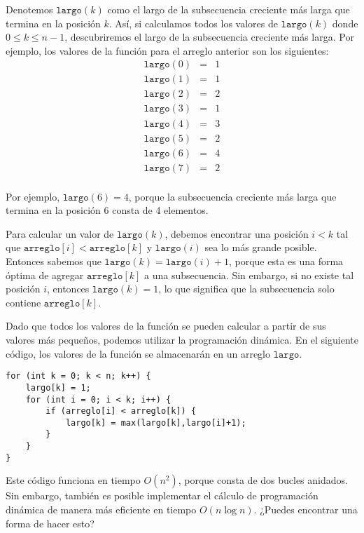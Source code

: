 Denotemos $\texttt{largo}(k)$ como
el largo de la
subsecuencia creciente más larga
que termina en la posición $k$.
Así, si calculamos todos los valores de
$\texttt{largo}(k)$ donde $0 \le k \le n-1$,
descubriremos el largo de la
subsecuencia creciente más larga.
Por ejemplo, los valores de la función
para el arreglo anterior son los siguientes:
\[
\begin{array}{lcl}
\texttt{largo}(0) & = & 1 \\
\texttt{largo}(1) & = & 1 \\
\texttt{largo}(2) & = & 2 \\
\texttt{largo}(3) & = & 1 \\
\texttt{largo}(4) & = & 3 \\
\texttt{largo}(5) & = & 2 \\
\texttt{largo}(6) & = & 4 \\
\texttt{largo}(7) & = & 2 \\
\end{array}
\]

Por ejemplo, $\texttt{largo}(6)=4$,
porque la subsecuencia creciente más larga
que termina en la posición 6 consta de 4 elementos.

Para calcular un valor de $\texttt{largo}(k)$,
debemos encontrar una posición $i<k$
tal que $\texttt{arreglo}[i]<\texttt{arreglo}[k]$
y $\texttt{largo}(i)$ sea lo más grande posible.
Entonces sabemos que
$\texttt{largo}(k)=\texttt{largo}(i)+1$,
porque esta es una forma óptima de agregar
$\texttt{arreglo}[k]$ a una subsecuencia.
Sin embargo, si no existe tal posición $i$,
entonces $\texttt{largo}(k)=1$,
lo que significa que la subsecuencia solo contiene
$\texttt{arreglo}[k]$.

Dado que todos los valores de la función se pueden calcular
a partir de sus valores más pequeños,
podemos utilizar la programación dinámica.
En el siguiente código, los valores
de la función se almacenarán en un arreglo
$\texttt{largo}$.

\begin{lstlisting}
for (int k = 0; k < n; k++) {
    largo[k] = 1;
    for (int i = 0; i < k; i++) {
        if (arreglo[i] < arreglo[k]) {
            largo[k] = max(largo[k],largo[i]+1);
        }
    }
}
\end{lstlisting}

Este código funciona en tiempo $O(n^2)$,
porque consta de dos bucles anidados.
Sin embargo, también es posible implementar
el cálculo de programación dinámica
de manera más eficiente en tiempo $O(n \log n)$.
¿Puedes encontrar una forma de hacer esto?

